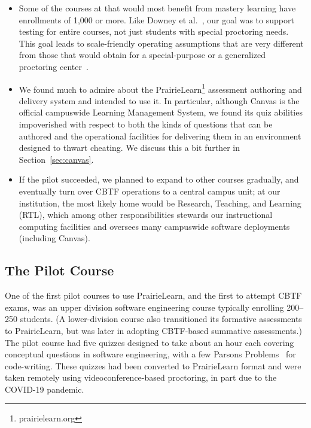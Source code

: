 \begin{itemize}

\item Some of the
  courses at \inst{} that would most benefit from mastery learning have
enrollments of 1,000 or more.  Like Downey et al.~\cite{downey-cbtf},
our goal was to support testing for entire courses,
not just students with
special proctoring needs.
This  goal leads to 
scale-friendly operating assumptions that are very different from
those that would obtain for a special-purpose or a generalized proctoring
center~\cite{fox-cbtf-not-proctoring}.  

\item We found much to admire about the
  PrairieLearn\footnote{prairielearn.org} assessment authoring and
  delivery system and intended to use it.  In particular, although 
  Canvas is the official campuswide Learning Management System, we
  found its quiz abilities impoverished with respect to both the kinds
  of questions that can be authored and the operational facilities for
  delivering them in an environment designed to thwart cheating.  We
  discuss this a bit further in Section~\ref{sec:canvas}.

\item If the pilot succeeded, we planned to expand to other courses
  gradually, and eventually turn over CBTF operations to a central
  campus unit; at our institution, the most likely home would be
  Research, Teaching, and Learning (RTL), which among other
  responsibilities stewards our instructional computing facilities and
  oversees many campuswide software deployments (including Canvas).

\end{itemize}

\subsection{The Pilot Course}

One of the first pilot courses to use PrairieLearn, and the first to
attempt CBTF exams, was an upper division software engineering course
typically enrolling 200--250 students.  (A lower-division course also
transitioned its formative assessments to PrairieLearn, but was later in
adopting CBTF-based summative assessments.)
The pilot course
had five quizzes designed to take about an hour each covering
conceptual questions in software engineering, with a few Parsons
Problems~\cite{parsons} for code-writing.  These quizzes had been converted
to PrairieLearn format and were taken remotely using
videoconference-based proctoring, in part due to the
COVID-19 pandemic.


